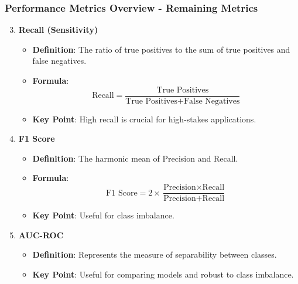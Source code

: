 \documentclass{beamer}
\begin{document}
\begin{frame}[fragile]
    \frametitle{Performance Metrics Overview - Remaining Metrics}
    \begin{enumerate}
        \setcounter{enumi}{2}
        \item \textbf{Recall (Sensitivity)}
        \begin{itemize}
            \item \textbf{Definition}: The ratio of true positives to the sum of true positives and false negatives.
            \item \textbf{Formula}:
            \begin{equation}
                \text{Recall} = \frac{\text{True Positives}}{\text{True Positives} + \text{False Negatives}}
            \end{equation}
            \item \textbf{Key Point}: High recall is crucial for high-stakes applications.
        \end{itemize}
        
        \item \textbf{F1 Score}
        \begin{itemize}
            \item \textbf{Definition}: The harmonic mean of Precision and Recall.
            \item \textbf{Formula}:
            \begin{equation}
                \text{F1 Score} = 2 \times \frac{\text{Precision} \times \text{Recall}}{\text{Precision} + \text{Recall}}
            \end{equation}
            \item \textbf{Key Point}: Useful for class imbalance.
        \end{itemize}
        
        \item \textbf{AUC-ROC}
        \begin{itemize}
            \item \textbf{Definition}: Represents the measure of separability between classes.
            \item \textbf{Key Point}: Useful for comparing models and robust to class imbalance.
        \end{itemize}
    \end{enumerate}
\end{frame}
\end{document}
